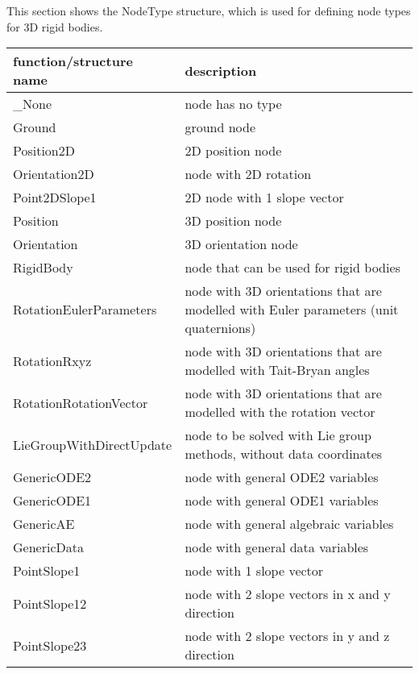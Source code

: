 \label{sec:NodeType}
This section shows the NodeType structure, which is used for defining node types for 3D rigid bodies.



\begin{center}
\footnotesize
\begin{longtable}{| p{8cm} | p{8cm} |} 
\hline
{\bf function/structure name} & {\bf description}\\ \hline
  \_None & node has no type\\ \hline  
  Ground & ground node\\ \hline  
  Position2D & 2D position node \\ \hline  
  Orientation2D & node with 2D rotation\\ \hline  
  Point2DSlope1 & 2D node with 1 slope vector\\ \hline  
  Position & 3D position node\\ \hline  
  Orientation & 3D orientation node\\ \hline  
  RigidBody & node that can be used for rigid bodies\\ \hline  
  RotationEulerParameters & node with 3D orientations that are modelled with Euler parameters (unit quaternions)\\ \hline  
  RotationRxyz & node with 3D orientations that are modelled with Tait-Bryan angles\\ \hline  
  RotationRotationVector & node with 3D orientations that are modelled with the rotation vector\\ \hline  
  LieGroupWithDirectUpdate & node to be solved with Lie group methods, without data coordinates\\ \hline  
  GenericODE2 & node with general ODE2 variables\\ \hline  
  GenericODE1 & node with general ODE1 variables\\ \hline  
  GenericAE & node with general algebraic variables\\ \hline  
  GenericData & node with general data variables\\ \hline  
  PointSlope1 & node with 1 slope vector\\ \hline  
  PointSlope12 & node with 2 slope vectors in x and y direction\\ \hline  
  PointSlope23 & node with 2 slope vectors in y and z direction\\ \hline  
\end{longtable}
\end{center}

